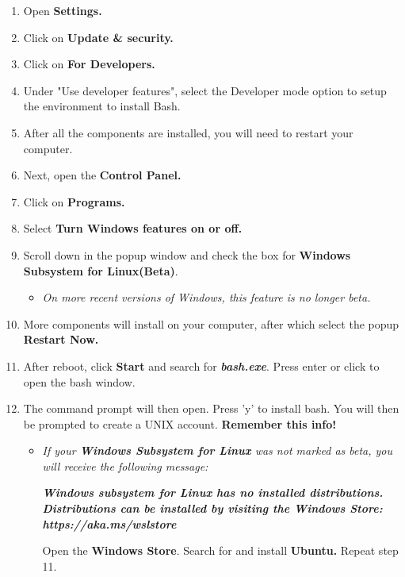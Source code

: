 \documentclass[12pt, titlepage]{article}
\begin{document}
		\begin{enumerate}
			
			\item Open \textbf{Settings.}
			
			\item Click on \textbf{Update \& security.}

			\item Click on \textbf{For Developers.}

			\item Under "Use developer features", select the Developer mode option to setup the environment to install Bash.		
			
			\item After all the components are installed, you will need to restart your computer.
		
			\item Next, open the \textbf{Control Panel.}
			
			\item Click on \textbf{Programs.}
			
			\item Select \textbf{Turn Windows features on or off.}
			
			\item Scroll down in the popup window and check the box for \textbf{Windows Subsystem for Linux(Beta)}.  
				
				\begin{itemize}
					\item \textit{On more recent versions of Windows, this feature is no longer beta.}
				\end{itemize}
						
			\item More components will install on your computer, after which select the popup \textbf{Restart Now.}
			
			\item After reboot, click \textbf{Start} and search for \textbf{\textit{bash.exe}}.  Press enter or click to open the bash window.
			
			\item The command prompt will then open.  Press 'y' to install bash.  You will then be prompted to create a UNIX account.  \textbf{Remember this info!} 			
				
				\begin{itemize}
					
					\item \textit{If your \textbf{Windows Subsystem for Linux} was not marked as beta, you will receive the following message:}	
										
						\textbf{\textit{Windows subsystem for Linux has no installed distributions. Distributions can be installed by visiting the Windows Store: https://aka.ms/wslstore	}}					
					
					Open the \textbf{Windows Store}. Search for and install \textbf{Ubuntu.} Repeat step 11. 
		
				\end{itemize}
		
		\end{enumerate}
		
\end{document}
